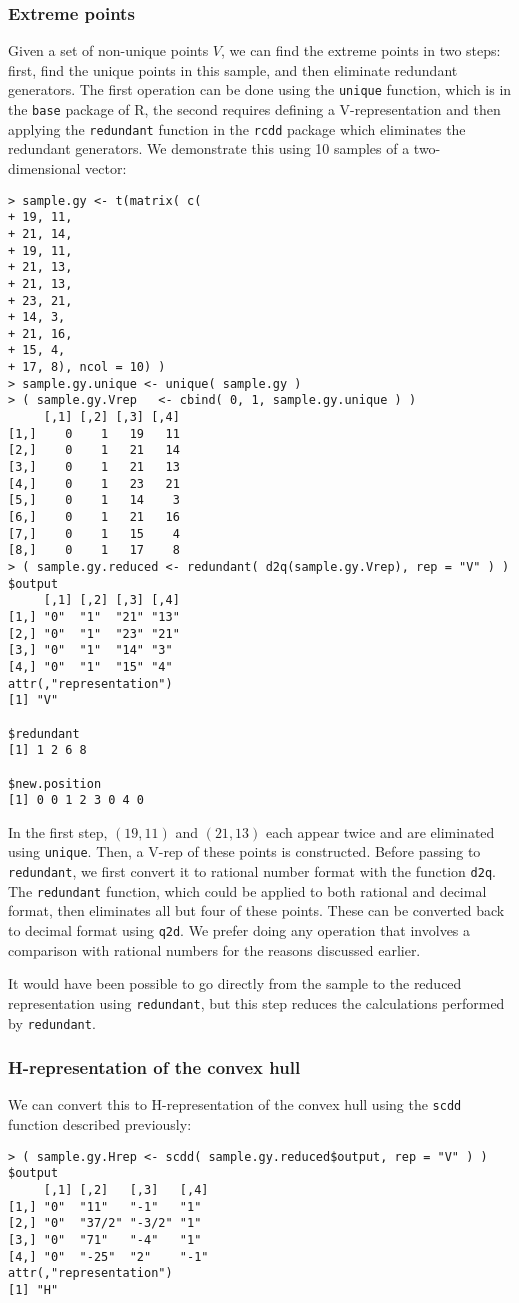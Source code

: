 \subsubsection{Extreme points}
Given a set of non-unique points $V$, we can find the extreme points in two steps:
first, find the unique points in this sample, and then eliminate redundant generators.  The first operation can be done using the \texttt{unique} function, 
which is in the \texttt{base} package of R, the second requires defining a V-representation and then applying the \texttt{redundant} function in the \texttt{rcdd}
package which eliminates the redundant generators.
We demonstrate this using 10 samples of a two-dimensional vector:
\begin{verbatim}
> sample.gy <- t(matrix( c(
+ 19, 11,
+ 21, 14,
+ 19, 11,
+ 21, 13,
+ 21, 13,
+ 23, 21,
+ 14, 3,
+ 21, 16,
+ 15, 4,
+ 17, 8), ncol = 10) )
> sample.gy.unique <- unique( sample.gy ) 
> ( sample.gy.Vrep 	 <- cbind( 0, 1, sample.gy.unique ) )
     [,1] [,2] [,3] [,4]
[1,]    0    1   19   11
[2,]    0    1   21   14
[3,]    0    1   21   13
[4,]    0    1   23   21
[5,]    0    1   14    3
[6,]    0    1   21   16
[7,]    0    1   15    4
[8,]    0    1   17    8
> ( sample.gy.reduced <- redundant( d2q(sample.gy.Vrep), rep = "V" ) )
$output
     [,1] [,2] [,3] [,4]
[1,] "0"  "1"  "21" "13"
[2,] "0"  "1"  "23" "21"
[3,] "0"  "1"  "14" "3" 
[4,] "0"  "1"  "15" "4" 
attr(,"representation")
[1] "V"

$redundant
[1] 1 2 6 8

$new.position
[1] 0 0 1 2 3 0 4 0
\end{verbatim}
In the first step, $(19,11)$ and $(21,13)$ each appear twice and are eliminated
using \texttt{unique}.  Then, a V-rep of these points is constructed.  Before
passing to \texttt{redundant}, we first convert it to rational number format
with the function \texttt{d2q}.  The \texttt{redundant} function, which could
be applied to both rational and decimal format, then eliminates
all but four of these points.  These can be converted back to decimal format
using \texttt{q2d}.  We prefer doing any operation that involves a comparison
with rational numbers for the reasons discussed earlier.

It would have been possible to go directly from the sample to the reduced 
representation using \texttt{redundant}, but this step reduces the calculations
performed by \texttt{redundant}.

\subsubsection{H-representation of the convex hull}
We can convert this to H-representation of the convex hull 
using the \texttt{scdd} function described previously:
\begin{verbatim}
> ( sample.gy.Hrep <- scdd( sample.gy.reduced$output, rep = "V" ) )
$output
     [,1] [,2]   [,3]   [,4]
[1,] "0"  "11"   "-1"   "1" 
[2,] "0"  "37/2" "-3/2" "1" 
[3,] "0"  "71"   "-4"   "1" 
[4,] "0"  "-25"  "2"    "-1"
attr(,"representation")
[1] "H"
\end{verbatim}

